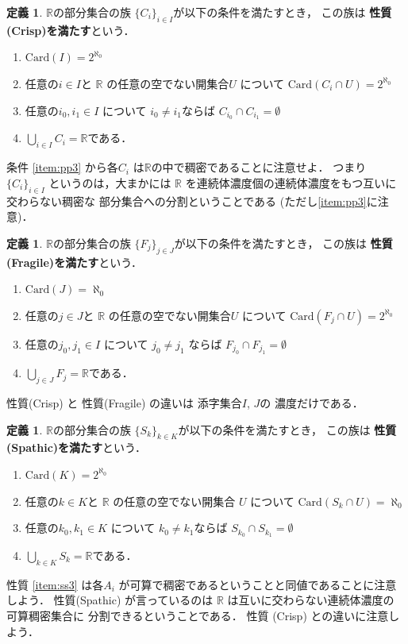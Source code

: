\documentclass[leqno, a4paper, 12pt]{jsarticle}
\theoremstyle{definition}
\newtheorem{df}[thm]{定義}
\newcommand{\rr}{\mathbb{R}}
\newcommand{\card}{\mathrm{Card}}
\newcommand{\myco}{2^{\aleph_{0}}}
\newcommand{\mysei}{\textup{(Crisp)}}
\newcommand{\myseial}{C}
\newcommand{\mysq}{\textup{(Fragile)}}
\newcommand{\mysqal}{F}
\newcommand{\mysw}{\textup{(Spathic)}}
\newcommand{\myswal}{S}
\begin{document}
\begin{df}\label{df:c}
$\rr$の部分集合の族
$\{C_{i}\}_{i\in I}$が以下の条件を満たすとき，
この族は
\textbf{性質\mysei を満たす}という．
\begin{enumerate}[label=\textup{(\myseial\arabic*)}]
\item\label{item:pp1}
$\card(I)=\myco$
\item\label{item:pp3}
任意の$i\in I$と
$\rr$
の任意の空でない開集合$U$
について
$\card(C_{i}\cap U)=\myco$
\item\label{item:pp4}
任意の$i_{0}, i_{1}\in I$
について
$i_{0}\neq i_{1}$ならば
$C_{i_{0}}\cap C_{i_{1}}=\emptyset$
\item\label{item:pp6}
$\bigcup_{i\in I}C_{i}=\rr$である．
\end{enumerate}
条件
\ref{item:pp3}
から各$C_{i}$
は$\rr$の中で稠密であることに注意せよ．
つまり
$\{C_{i}\}_{i\in I}$
というのは，大まかには
$\rr$
を連続体濃度個の連続体濃度をもつ互いに交わらない稠密な
部分集合への分割ということである
(ただし\ref{item:pp3}に注意)．
\end{df}

\begin{df}\label{df:f}
$\rr$の部分集合の族
$\{F_{j}\}_{j\in J}$が以下の条件を満たすとき，
この族は
\textbf{性質\mysq を満たす}という．
\begin{enumerate}[label=\textup{(\mysqal\arabic*)}]
\item\label{item:qq1}
$\card(J)=\aleph_{0}$
\item\label{item:qq3}
任意の$j\in J$と
$\rr$
の任意の空でない開集合$U$
について
$\card(F_{j}\cap U)=\myco$
\item\label{item:qq4}
任意の$j_{0},  j_{1}\in I$
について
$j_{0}\neq j_{1}$
ならば
$F_{j_{0}}\cap F_{j_{1}}=\emptyset$
\item\label{item:qq6}
$\bigcup_{j\in J}F_{j}=\rr$である．
\end{enumerate}
性質\mysei
と
性質\mysq
の違いは
添字集合$I$, 
$J$の
濃度だけである．
\end{df}



\begin{df}\label{df:s}
$\rr$の部分集合の族
$\{S_{k}\}_{k\in K}$が以下の条件を満たすとき，
この族は
\textbf{性質\mysw を満たす}という．
\begin{enumerate}[label=\textup{(\myswal\arabic*)}]
\item\label{item:ss1}
$\card(K)=\myco$
\item\label{item:ss3}
任意の$k\in K$と
$\rr$
の任意の空でない開集合
$U$
について
$\card(S_{k}\cap U)=\aleph_{0}$
\item\label{item:ss4}
任意の$k_{0}, k_{1}\in K$
について
$k_{0}\neq k_{1}$ならば
$S_{k_{0}}\cap S_{k_{1}}=\emptyset$
\item\label{item:ss6}
$\bigcup_{k\in K}S_{k}=\rr$である．
\end{enumerate}
性質
\ref{item:ss3}
は各$A_{i}$
が可算で稠密であるということと同値であることに注意しよう．
性質\mysw
が言っているのは
$\rr$
は互いに交わらない連続体濃度の
可算稠密集合に
分割できるということである．
性質
\mysei
との違いに注意しよう．
\end{df}
\end{document}
